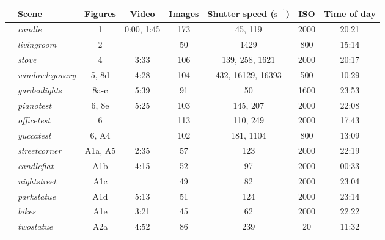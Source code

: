 


\begin{table*}[]
    \centering
    \begin{tabular}{r|l|cccccc}
    & Scene & Figures & Video & Images & Shutter speed ($\text{s}^{-1}$) & ISO & Time of day \\ \hline
 \parbox[t]{3mm}{}
 & \textit{candle}           &  1        &  0:00, 1:45     &  173  &               45, 119  &   2000  &  20:21   \\
 & \textit{livingroom}       &  2        &       &   50  &                  1429  &    800  &  15:14   \\
 & \textit{stove}            &  4        &  3:33     &  106  &        139, 258, 1621  &   2000  &  20:17   \\
 & \textit{windowlegovary}   &  5, 8d    &  4:28     &  104  &     432, 16129, 16393  &    500  &  10:29   \\
 & \textit{gardenlights}     &  8a-c     &  5:39     &   91  &                    50  &   1600  &  23:53   \\ \hline
 \parbox[t]{3mm}{} 
 & \textit{pianotest}        &  6, 8e    &  5:25     &  103  &              145, 207  &   2000  &  22:08   \\
 & \textit{officetest}       &  6        &       &  113  &              110, 249  &   2000  &  17:43   \\
 & \textit{yuccatest}        &  6, A4    &       &  102  &             181, 1104  &    800  &  13:09   \\ \hline
 \parbox[t]{3mm}{} 
 & \textit{streetcorner}     &  A1a, A5  &  2:35     &   57  &                   123  &   2000  &  22:19   \\
 & \textit{candlefiat}       &  A1b      &  4:15     &   52  &                    97  &   2000  &  00:33   \\
 & \textit{nightstreet}      &  A1c      &       &   49  &                    82  &   2000  &  23:04   \\
 & \textit{parkstatue}       &  A1d      &  5:13     &   51  &                   124  &   2000  &  23:14   \\
 & \textit{bikes}            &  A1e      &  3:21     &   45  &                    62  &   2000  &  22:22   \\
 & \textit{twostatue}        &  A2a      &  4:52     &   86  &                   239  &     20  &  11:32   \\

\end{tabular}
\end{table*}
